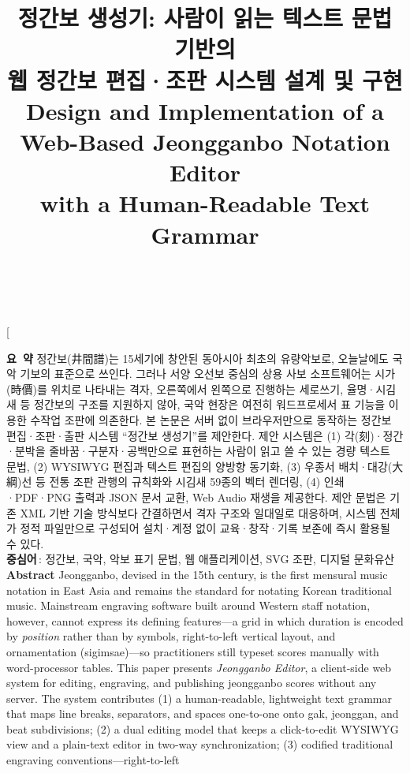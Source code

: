 \documentclass[twocolumn,10pt]{article}
\title{\Large\textbf{정간보 생성기: 사람이 읽는 텍스트 문법 기반의\\
웹 정간보 편집·조판 시스템 설계 및 구현}\\[4pt]
\large Design and Implementation of a Web-Based Jeongganbo Notation Editor\\
with a Human-Readable Text Grammar}
\author{\TODO{저자명(심사용 파일에서는 삭제)} \\ \small \TODO{소속·직위}}
\date{}
\begin{document}
\twocolumn[{
\maketitle
\vspace{-1.5em}
\begin{center}
\begin{minipage}{0.92\textwidth}
\small
\textbf{요\ 약}\quad
정간보(井間譜)는 15세기에 창안된 동아시아 최초의 유량악보로, 오늘날에도
국악 기보의 표준으로 쓰인다. 그러나 서양 오선보 중심의 상용 사보
소프트웨어는 시가(時價)를 위치로 나타내는 격자, 오른쪽에서 왼쪽으로
진행하는 세로쓰기, 율명·시김새 등 정간보의 구조를 지원하지 않아,
국악 현장은 여전히 워드프로세서 표 기능을 이용한 수작업 조판에 의존한다.
본 논문은 서버 없이 브라우저만으로 동작하는 정간보 편집·조판·출판 시스템
``정간보 생성기''를 제안한다. 제안 시스템은 (1) 각(刻)·정간·분박을
줄바꿈·구분자·공백만으로 표현하는 사람이 읽고 쓸 수 있는 경량 텍스트 문법,
(2) WYSIWYG 편집과 텍스트 편집의 양방향 동기화, (3) 우종서 배치·대강(大綱)선
등 전통 조판 관행의 규칙화와 시김새 59종의 벡터 렌더링, (4) 인쇄·PDF·PNG
출력과 JSON 문서 교환, Web Audio 재생을 제공한다. 제안 문법은 기존 XML 기반
기술 방식보다 간결하면서 격자 구조와 일대일로 대응하며, 시스템 전체가 정적
파일만으로 구성되어 설치·계정 없이 교육·창작·기록 보존에 즉시 활용될 수 있다.
\\[2pt]
\textbf{중심어}\,: 정간보, 국악, 악보 표기 문법, 웹 애플리케이션, SVG 조판, 디지털 문화유산
\\[8pt]
\textbf{Abstract}\quad
Jeongganbo, devised in the 15th century, is the first mensural music notation
in East Asia and remains the standard for notating Korean traditional music.
Mainstream engraving software built around Western staff notation, however,
cannot express its defining features---a grid in which duration is encoded by
\emph{position} rather than by symbols, right-to-left vertical layout, and
ornamentation (sigimsae)---so practitioners still typeset scores manually with
word-processor tables. This paper presents \emph{Jeongganbo Editor}, a
client-side web system for editing, engraving, and publishing jeongganbo
scores without any server. The system contributes (1) a human-readable,
lightweight text grammar that maps line breaks, separators, and spaces
one-to-one onto gak, jeonggan, and beat subdivisions; (2) a dual editing model
that keeps a click-to-edit WYSIWYG view and a plain-text editor in two-way
synchronization; (3) codified traditional engraving conventions---right-to-left

\end{minipage}
\end{center}}
\end{document}
